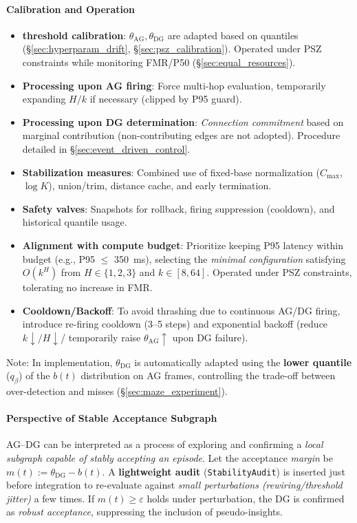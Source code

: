 \documentclass[12pt]{article}
\begin{document}
\paragraph{Calibration and Operation}
\begin{itemize}[leftmargin=*]
  \item \textbf{threshold calibration}: $\theta_{\mathrm{AG}},\theta_{\mathrm{DG}}$ are adapted based on quantiles (\S\ref{sec:hyperparam_drift}, \S\ref{sec:psz_calibration}). Operated under PSZ constraints while monitoring FMR/P50 (\S\ref{sec:equal_resources}).
  \item \textbf{Processing upon AG firing}: Force multi-hop evaluation, temporarily expanding $H/k$ if necessary (clipped by P95 guard).
  \item \textbf{Processing upon DG determination}: \emph{Connection commitment} based on marginal contribution (non-contributing edges are not adopted). Procedure detailed in \S\ref{sec:event_driven_control}.
  \item \textbf{Stabilization measures}: Combined use of fixed-base normalization ($C_{\max}$, $\log K$), union/trim, distance cache, and early termination.
  \item \textbf{Safety valves}: Snapshots for rollback, firing suppression (cooldown), and historical quantile usage.
  \item \textbf{Alignment with compute budget}: Prioritize keeping P95 latency within budget (e.g., P95 $\le$ \SI{350}{ms}), selecting the \emph{minimal configuration} satisfying $O(k^H)$ from $H\in\{1,2,3\}$ and $k\in[8,64]$. Operated under PSZ constraints, tolerating no increase in FMR.
  \item \textbf{Cooldown/Backoff}: To avoid thrashing due to continuous AG/DG firing, introduce re-firing cooldown (3--5 steps) and exponential backoff (reduce $k\downarrow/ H\downarrow$/ temporarily raise $\theta_{\mathrm{AG}}\uparrow$ upon DG failure).
\end{itemize}

\noindent Note: In implementation, $\theta_{\mathrm{DG}}$ is automatically adapted using the \textbf{lower quantile} ($q_\beta$) of the $b(t)$ distribution on AG frames, controlling the trade-off between over-detection and misses (\S\ref{sec:maze_experiment}).

\paragraph{Perspective of Stable Acceptance Subgraph}
AG--DG can be interpreted as a process of exploring and confirming a \emph{local subgraph capable of stably accepting an episode}. Let the acceptance \emph{margin} be $m(t):=\theta_{\mathrm{DG}}-b(t)$. A \textbf{lightweight audit} (\texttt{StabilityAudit}) is inserted just before integration to re-evaluate against \emph{small perturbations (rewiring/threshold jitter)} a few times. If $m(t)\ge \varepsilon$ holds under perturbation, the DG is confirmed as \emph{robust acceptance}, suppressing the inclusion of pseudo-insights.
\end{document}
